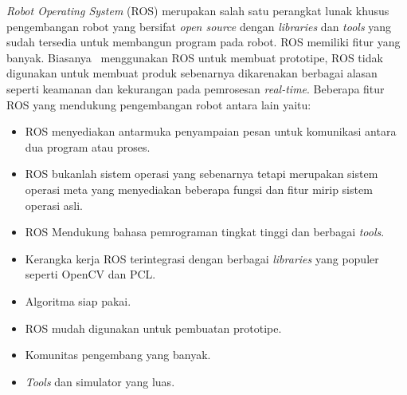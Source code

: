    \textit{Robot Operating System} (ROS) merupakan salah satu perangkat lunak khusus pengembangan robot yang bersifat \textit{open source} dengan \textit{libraries} dan \textit{tools} yang sudah tersedia untuk membangun program pada robot. ROS memiliki fitur yang banyak. Biasanya \dev\ menggunakan ROS untuk membuat prototipe, ROS tidak digunakan untuk membuat produk sebenarnya dikarenakan berbagai alasan seperti keamanan dan kekurangan pada pemrosesan \textit{real-time}\cite{br1}. Beberapa fitur ROS yang mendukung pengembangan robot antara lain yaitu:
    \begin{itemize}
     \item ROS menyediakan antarmuka penyampaian pesan untuk komunikasi antara dua program atau proses.
     \item ROS bukanlah sistem operasi yang sebenarnya tetapi merupakan sistem operasi meta yang menyediakan beberapa fungsi dan fitur mirip sistem operasi asli.
     \item ROS Mendukung bahasa pemrograman tingkat tinggi dan berbagai \textit{tools}.
     \item Kerangka kerja ROS terintegrasi dengan berbagai \textit{libraries} yang populer seperti OpenCV dan PCL.
     \item Algoritma siap pakai.
     \item ROS mudah digunakan untuk pembuatan prototipe.
     \item Komunitas pengembang yang banyak.
     \item \textit{Tools} dan simulator yang luas.
     \end{itemize}

